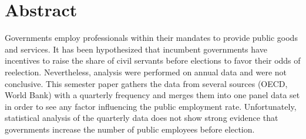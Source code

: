 \chapter*{Abstract}

Governments employ professionals within their mandates to provide public goods
and services. It has been hypothesized that incumbent governments have
incentives to raise the share of civil servants before elections to favor their
odds of reelection. Nevertheless, analysis were performed on annual data and
were not conclusive. This semester paper gathers the data from several sources
(OECD, World Bank) with a quarterly frequency and merges them into one panel
data set in order to see any factor influencing the public employment
rate. Unfortunately, statistical analysis of the quarterly data does not show
strong evidence that governments increase the number of public employees before
election.

